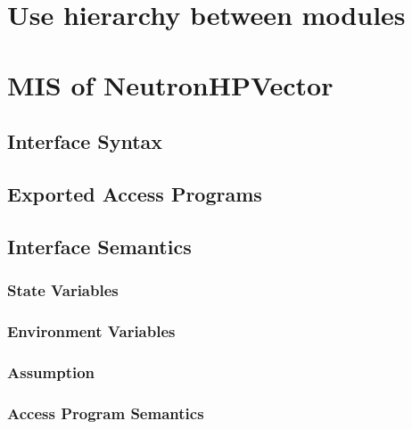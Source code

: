 \documentclass[12pt]{article}
\begin{document}
\section{Use hierarchy between modules}%

\section{MIS of NeutronHPVector}

\subsection{Interface Syntax}%

\subsection{Exported Access Programs}%


\subsection{Interface Semantics}

\subsubsection{State Variables}%

\subsubsection{Environment Variables}%

\subsubsection{Assumption}%

\subsubsection{Access Program Semantics}%
\end{document}
